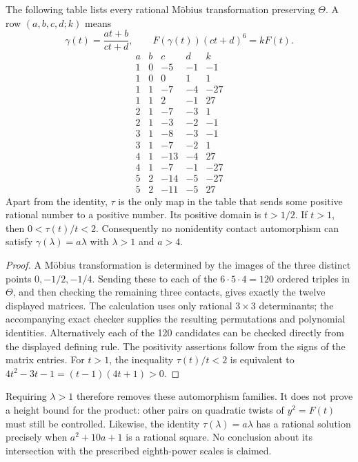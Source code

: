 \begin{proposition}
The following table lists every rational M\"obius transformation
preserving $\Theta$. A row $(a,b,c,d;k)$ means
\[
 \gamma(t)=\frac{at+b}{ct+d},\qquad
              F(\gamma(t))(ct+d)^6=kF(t).
\]
\[
\begin{array}{rrrr|r}
a&b&c&d&k\\\hline
1&0&-5&-1&-1\\
1&0&0&1&1\\
1&1&-7&-4&-27\\
1&1&2&-1&27\\
2&1&-7&-3&1\\
2&1&-3&-2&-1\\
3&1&-8&-3&-1\\
3&1&-7&-2&1\\
4&1&-13&-4&27\\
4&1&-7&-1&-27\\
5&2&-14&-5&-27\\
5&2&-11&-5&27
\end{array}
\]
Apart from the identity, $\tau$ is the only map in the table
that sends some positive rational number to a positive number.
Its positive domain is $t>1/2$. If $t>1$, then
$0<\tau(t)/t<2$. Consequently no nonidentity contact automorphism
can satisfy $\gamma(\lambda)=a\lambda$ with $\lambda>1$ and $a>4$.
\end{proposition}
\begin{proof}
A M\"obius transformation is determined by the images of the
three distinct points $0,-1/2,-1/4$. Sending these to each of the
$6\cdot5\cdot4=120$ ordered triples in $\Theta$, and then checking
the remaining three contacts, gives exactly the twelve displayed
matrices. The calculation uses only rational $3\times3$
determinants; the accompanying exact checker supplies the resulting
permutations and polynomial identities. Alternatively each of the
120 candidates can be checked directly from the displayed defining
rule. The positivity assertions follow from the signs of the matrix
entries. For $t>1$, the inequality $\tau(t)/t<2$ is equivalent
to $4t^2-3t-1=(t-1)(4t+1)>0$.
\end{proof}

Requiring $\lambda>1$ therefore removes these automorphism
families. It does not prove a height bound for the product: other
pairs on quadratic twists of $y^2=F(t)$ must still be controlled.
Likewise, the identity
$\tau(\lambda)=a\lambda$ has a rational solution precisely when
$a^2+10a+1$ is a rational square. No conclusion about its
intersection with the prescribed eighth-power scales is claimed.
